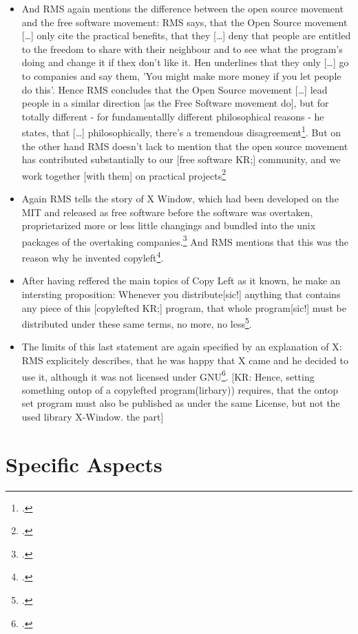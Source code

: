 \documentclass[DIV=calc,BCOR=5mm,11pt,headings=small,oneside,abstract=true, toc=bib]{scrartcl}
\begin{document}
\begin{itemize}
  freedoms\footcite[cf][163ff]{Stallman2001a}
  \item And RMS again mentions the difference between the \glqq{}open
  source movement\grqq{} and the \glqq{}free software movement\grqq{}: RMS says,
  that the Open Source movement \glqq{}[\ldots] only cite the practical
  benefits\grqq{}, that they \glqq{}[\ldots] deny that people are
  entitled to the freedom to share with their neighbour and to see what
  the program's doing and change it if thex don't like it\grqq{}. Hen underlines
  that they only \glqq{}[\ldots] go to companies and say them, 'You might
  make more money if you let people do this'\grqq{}. Hence RMS concludes that
  the Open Source movement \glqq{}[\ldots] lead people in a similar direction
  [as the Free Software movement do], but for totally different - for
  fundamentallly different philosophical reasons\grqq{} - he states, that
  \glqq{}[\ldots] philosophically, there's a tremendous
  disagreement\grqq{}\footcite[cf][167]{Stallman2001a}. But on the other hand
  RMS doesn't lack to mention that \glqq{}the open source movement has
  contributed substantially to our [free software KR;] community, and we work
  together [with them] on practical
  projects\grqq{}\footcite[cf][167]{Stallman2001a}
  \item Again RMS tells the story of X Window, which had been developed on the
  MIT and released as free software before the software was overtaken,
  proprietarized more or less little changings and bundled into the unix
  packages of the overtaking companies.\footcite[cf][168f]{Stallman2001a} And
  RMS mentions that this was the reason why he invented 
  \glqq{}copyleft\grqq{}\footcite[cf][169]{Stallman2001a}.
  \item After having reffered the main topics of Copy Left as it known, he make
  an intersting proposition: \glqq{}Whenever you distribute[sic!]
  anything that contains any piece of this [copylefted KR;] program, that
  whole program[sic!] must be distributed under these same terms, no
  more, no less\grqq{}\footcite[cf][169]{Stallman2001a}.
  \item The limits of this last statement are again specified by an explanation
  of X: RMS explicitely describes, that he was happy that X came and he decided
  to use it, although it was not licensed under
  GNU\footcite[cf][171]{Stallman2001a}. [KR: Hence, setting something ontop of a
  copylefted program(lirbary)) requires, that the ontop set program must also be
  published as under the same License, but not the used library X-Window. the
  part]
\end{itemize}


\section{Specific Aspects}

\small

\end{document}

